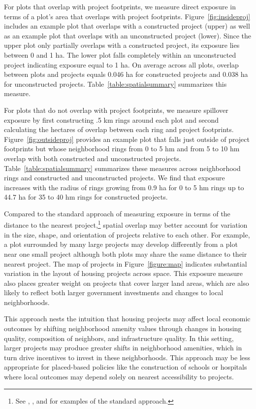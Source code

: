 \documentclass[12pt]{article}
\begin{document}
For plots that overlap with project footprints, we measure direct exposure in terms of a plot's area that overlaps with project footprints.  Figure~\ref{fig:insideproj} includes an example plot that overlaps with a constructed project (upper) as well as an example plot that overlaps with an unconstructed project (lower).  Since the upper plot only partially overlaps with a constructed project, its exposure lies between 0 and 1 ha.  The lower plot falls completely within an unconstructed project indicating exposure equal to 1 ha.  On average across all plots, overlap between plots and projects equals 0.046 ha for constructed projects and 0.038 ha for unconstructed projects. Table~\ref{table:spatialsummary} summarizes this measure.

For plots that do not overlap with project footprints, we measure spillover exposure by first constructing .5 km rings around each plot and second calculating the hectares of overlap between each ring and project footprints.  Figure~\ref{fig:outsideproj} provides an example plot that falls just outside of project footprints but whose neighborhood rings from 0 to 5 hm and from 5 to 10 hm overlap with both constructed and unconstructed projects.  Table~\ref{table:spatialsummary} summarizes these measures across neighborhood rings and constructed and unconstructed projects.  We find that exposure increases with the radius of rings growing from 0.9 ha for 0 to 5 hm rings up to 44.7 ha for 35 to 40 hm rings for constructed projects.  

Compared to the standard approach of measuring exposure in terms of the distance to the nearest project,\footnote{See \cite{diamond2016wants}, \cite{rossi2010housing}, and \cite{neumark2015place} for examples of the standard approach.} spatial overlap may better account for variation in the size, shape, and orientation of projects relative to each other.  For example, a plot surrounded by many large projects may develop differently from a plot near one small project although both plots may share the same distance to their nearest project.  The map of projects in Figure~\ref{figure:map} indicates substantial variation in the layout of housing projects across space.  This exposure measure also places greater weight on projects that cover larger land areas, which are also likely to reflect both larger government investments and changes to local neighborhoods.

This approach nests the intuition that housing projects may affect local economic outcomes by shifting neighborhood amenity values through changes in housing quality, composition of neighbors, and infrastructure quality.  In this setting, larger projects may produce greater shifts in neighborhood amenities, which in turn drive incentives to invest in these neighborhoods.  This approach may be less appropriate for placed-based policies like the construction of schools or hospitals where local outcomes may depend solely on nearest accessibility to projects.  
\end{document}
